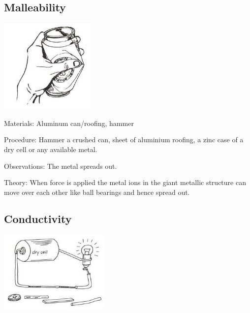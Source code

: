 \begin{multicols}{2}
\subsection{Malleability} 

\begin{center}
\includegraphics[width=0.35\textwidth]{./img/source/malleability.jpg}
\end{center}

\begin{description*}
\item[Materials:]{Aluminum can/roofing, hammer}
\item[Procedure:]{Hammer a crushed can, sheet of aluminium
roofing, a zinc case of a dry cell or any available
metal.}
\item[Observations:]{The metal spreads out.}
\item[Theory:]{When force is applied the metal ions in the
giant metallic structure can move over each
other like ball bearings and hence spread out.}
\end{description*}

\columnbreak

\subsection{Conductivity} 

\begin{center}
\includegraphics[width=0.4\textwidth]{./img/vso/conductivity.jpg}
\end{center}


\end{multicols}
